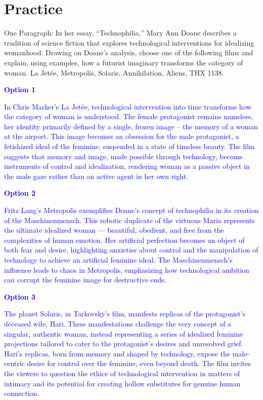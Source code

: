 \documentclass[11pt,fleqn]{book}
\begin{document}
\section{Practice}
\begin{exercise}
    One Paragraph: In her essay, “Technophilia,” Mary Ann Doane describes a tradition of science fiction that explores technological interventions for idealizing womanhood. Drawing on Doane’s analysis, choose one of the following films and explain, using examples, how a futurist imaginary transforms the category of woman. La Jetée, Metropolis, Solaris, Annihilation, Aliens, THX 1138.

    \textcolor{blue}{
\textbf{Option 1}
}

    \textcolor{blue}{
    In Chris Marker's La Jetée, technological intervention into time transforms how the category of woman is understood. The female protagonist remains nameless, her identity primarily defined by a single, frozen image – the memory of a woman at the airport. This image becomes an obsession for the male protagonist, a fetishized ideal of the feminine, suspended in a state of timeless beauty. The film suggests that memory and image, made possible through technology, become instruments of control and idealization, rendering woman as a passive object in the male gaze rather than an active agent in her own right.}

    \textcolor{blue}{
\textbf{Option 2}
}
    
    \textcolor{blue}{
    Fritz Lang's Metropolis exemplifies Doane's concept of technophilia in its creation of the Maschinenmensch. This robotic duplicate of the virtuous Maria represents the ultimate idealized woman — beautiful, obedient, and free from the complexities of human emotion. Her artificial perfection becomes an object of both fear and desire, highlighting anxieties about control and the manipulation of technology to achieve an artificial feminine ideal. The Maschinenmensch's influence leads  to chaos in Metropolis, emphasizing how technological ambition can corrupt the feminine image for destructive ends.}

    \textcolor{blue}{
\textbf{Option 3}
}
    
    \textcolor{blue}{
    The planet Solaris, in Tarkovsky's film, manifests replicas of the protagonist's deceased wife, Hari. These manifestations challenge the very concept of a  singular, authentic woman, instead representing a series of idealized feminine projections tailored to cater to the protagonist's desires and unresolved grief. Hari's replicas, born from memory and shaped by technology, expose the male-centric desire for control over the feminine, even beyond death. The film invites the viewers to question the ethics of  technological intervention in matters of intimacy and its potential for creating hollow substitutes for genuine human connection.}


\end{exercise}
\end{document}
